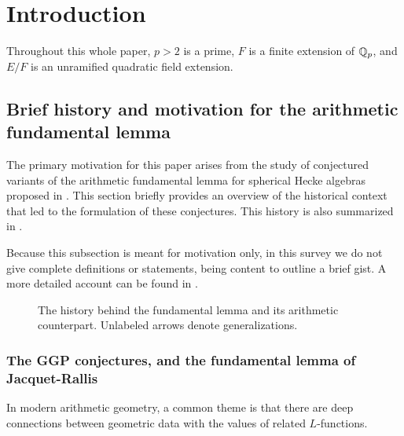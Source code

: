 \chapter{Introduction}
Throughout this whole paper, $p > 2$ is a prime,
$F$ is a finite extension of $\mathbb Q_p$,
and $E/F$ is an unramified quadratic field extension.

\section{Brief history and motivation for the arithmetic fundamental lemma}
The primary motivation for this paper arises from
the study of conjectured variants of the arithmetic fundamental lemma
for spherical Hecke algebras proposed in \cite{ref:AFLspherical}.
This section briefly provides an overview of the historical context
that led to the formulation of these conjectures.
This history is also summarized in .

Because this subsection is meant for motivation only, in this survey we do not give
complete definitions or statements, being content to outline a brief gist.
A more detailed account can be found in \cite{ref:survey}.

\begin{figure}[ht]
  \centering
  \caption{The history behind the fundamental lemma and its arithmetic counterpart.
    Unlabeled arrows denote generalizations.}
  \label{fig:history}
\end{figure}

\subsection{The GGP conjectures, and the fundamental lemma of Jacquet-Rallis}
In modern arithmetic geometry, a common theme is that there are deep connections
between geometric data with the values of related $L$-functions.

